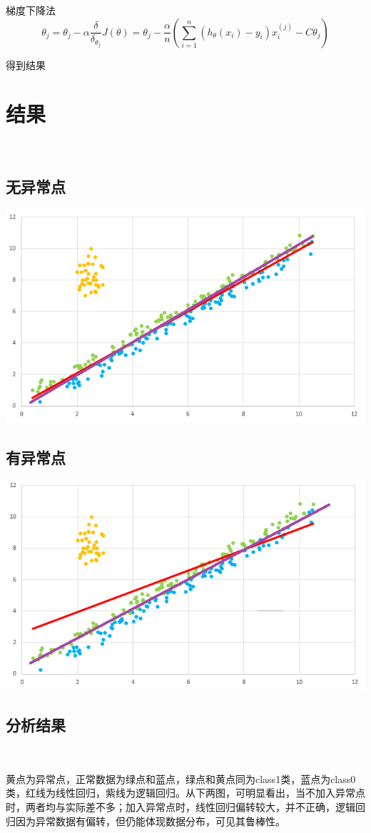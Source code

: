 \documentclass{article}
\begin{document}
			梯度下降法\[{\theta _j} = {\theta _j} - \alpha \frac{\delta }{{{\delta _{{\theta _j}}}}}J(\theta ) = {\theta _j} - \frac{\alpha }{n}(\sum\limits_{i = 1}^n {({h_\theta }({x_i}) - {y_i})x_i^{(j)}}  - C{\theta _j})\]
			
			得到结果
	\section{结果}\
		\subsection{无异常点}
			\includegraphics[scale=1.1]{0.png}
		\subsection{有异常点}
			\includegraphics[scale=1.1]{1.png}
		\subsection{分析结果}\
		
			黄点为异常点，正常数据为绿点和蓝点，绿点和黄点同为class1类，蓝点为class0类，红线为线性回归，紫线为逻辑回归。从下两图，可明显看出，当不加入异常点时，两者均与实际差不多；加入异常点时，线性回归偏转较大，并不正确，逻辑回归因为异常数据有偏转，但仍能体现数据分布，可见其鲁棒性。
		

	
\end{document}
